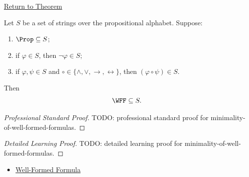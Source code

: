 \newpage
{}
\label{prf:minimality-of-well-formed-formulas}

\begin{remark*}[Return]
\hyperref[thm:minimality-of-well-formed-formulas]{Return to Theorem}
\end{remark*}

\begin{theorem*}
Let \(S\) be a set of strings over the propositional alphabet. Suppose:
\begin{enumerate}
  \item \(\Prop\subseteq S\);
  \item if \(\varphi\in S\), then \(\neg\varphi\in S\);
  \item if \(\varphi,\psi\in S\) and
        \(\circ\in\{\land,\lor,\to,\leftrightarrow\}\), then
        \((\varphi\circ\psi)\in S\).
\end{enumerate}
Then
\[
\WFF\subseteq S.
\]
\end{theorem*}

\begin{proof}[Professional Standard Proof]
\LRAProofBodyStart
TODO: professional standard proof for minimality-of-well-formed-formulas.
\end{proof}

\begin{proof}[Detailed Learning Proof]
\LRAProofBodyStart
TODO: detailed learning proof for minimality-of-well-formed-formulas.
\end{proof}

\begin{remark*}
\end{remark*}

\begin{dependencies}
\begin{itemize}
  \item \hyperref[def:well-formed-formula]{Well-Formed Formula}
\end{itemize}
\end{dependencies}

\clearpage
